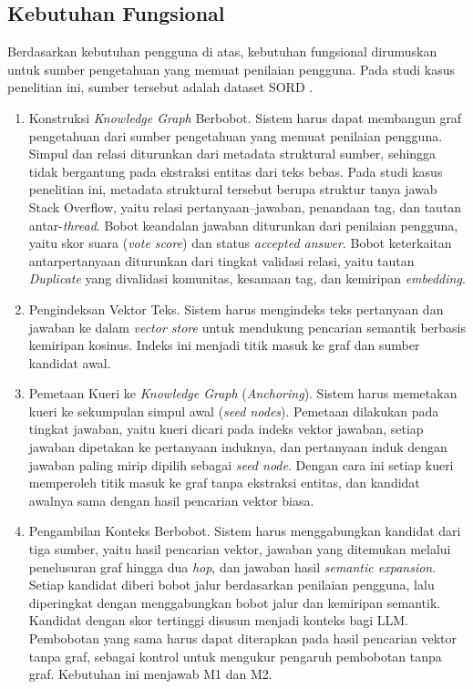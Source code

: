 \FloatBarrier
\subsection{Kebutuhan Fungsional}
\label{subsec:kebutuhan-fungsional}

Berdasarkan kebutuhan pengguna di atas, kebutuhan fungsional dirumuskan untuk sumber pengetahuan yang memuat penilaian pengguna. Pada studi kasus penelitian ini, sumber tersebut adalah dataset SORD \autocite{Fatima2026}.

\begin{enumerate}[label=\textbf{F\arabic*.}]
    \item Konstruksi \emph{Knowledge Graph} Berbobot.
    Sistem harus dapat membangun graf pengetahuan dari sumber pengetahuan yang memuat penilaian pengguna. Simpul dan relasi diturunkan dari metadata struktural sumber, sehingga tidak bergantung pada ekstraksi entitas dari teks bebas. Pada studi kasus penelitian ini, metadata struktural tersebut berupa struktur tanya jawab Stack Overflow, yaitu relasi pertanyaan--jawaban, penandaan tag, dan tautan antar-\emph{thread}. Bobot keandalan jawaban diturunkan dari penilaian pengguna, yaitu skor suara (\emph{vote score}) dan status \emph{accepted answer}. Bobot keterkaitan antarpertanyaan diturunkan dari tingkat validasi relasi, yaitu tautan \emph{Duplicate} yang divalidasi komunitas, kesamaan tag, dan kemiripan \emph{embedding}.
    \item Pengindeksan Vektor Teks.
    Sistem harus mengindeks teks pertanyaan dan jawaban ke dalam \emph{vector store} untuk mendukung pencarian semantik berbasis kemiripan kosinus. Indeks ini menjadi titik masuk ke graf dan sumber kandidat awal.

    \item Pemetaan Kueri ke \emph{Knowledge Graph} (\emph{Anchoring}).
    Sistem harus memetakan kueri ke sekumpulan simpul awal (\emph{seed nodes}). Pemetaan dilakukan pada tingkat jawaban, yaitu kueri dicari pada indeks vektor jawaban, setiap jawaban dipetakan ke pertanyaan induknya, dan pertanyaan induk dengan jawaban paling mirip dipilih sebagai \emph{seed node}. Dengan cara ini setiap kueri memperoleh titik masuk ke graf tanpa ekstraksi entitas, dan kandidat awalnya sama dengan hasil pencarian vektor biasa.

    \item Pengambilan Konteks Berbobot.
    Sistem harus menggabungkan kandidat dari tiga sumber, yaitu hasil pencarian vektor, jawaban yang ditemukan melalui penelusuran graf hingga dua \emph{hop}, dan jawaban hasil \emph{semantic expansion}. Setiap kandidat diberi bobot jalur berdasarkan penilaian pengguna, lalu diperingkat dengan menggabungkan bobot jalur dan kemiripan semantik. Kandidat dengan skor tertinggi disusun menjadi konteks bagi LLM. Pembobotan yang sama harus dapat diterapkan pada hasil pencarian vektor tanpa graf, sebagai kontrol untuk mengukur pengaruh pembobotan tanpa graf. Kebutuhan ini menjawab M1 dan M2.


\end{enumerate}
